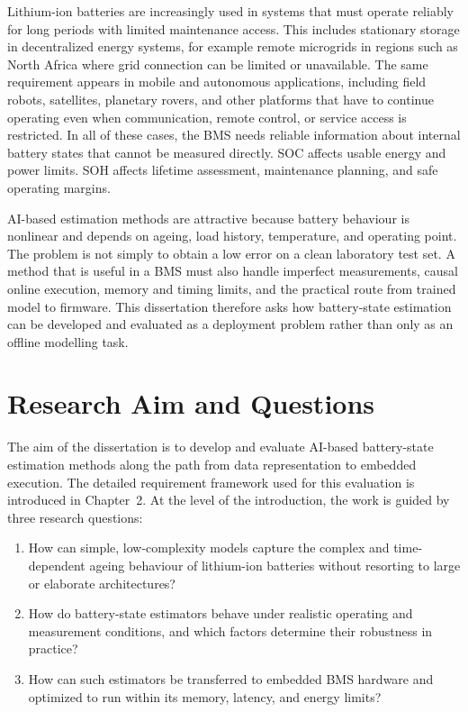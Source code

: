 \documentclass[
    a4paper,
    12pt,
    titlepage,
    bibliography=totoc,
    twoside=on,
    parskip=false,
    numbers=noenddot,
    cleardoublepage=empty,
    DIV=12,
    BCOR=12.0mm,
    headheight=36pt,
    headings=openright
]{scrreprt}
\begin{document}
Lithium-ion batteries are increasingly used in systems that must operate reliably for long periods with limited maintenance access. This includes stationary storage in decentralized energy systems, for example remote microgrids in regions such as North Africa where grid connection can be limited or unavailable. The same requirement appears in mobile and autonomous applications, including field robots, satellites, planetary rovers, and other platforms that have to continue operating even when communication, remote control, or service access is restricted. In all of these cases, the BMS needs reliable information about internal battery states that cannot be measured directly. SOC affects usable energy and power limits. SOH affects lifetime assessment, maintenance planning, and safe operating margins.

AI-based estimation methods are attractive because battery behaviour is nonlinear and depends on ageing, load history, temperature, and operating point. The problem is not simply to obtain a low error on a clean laboratory test set. A method that is useful in a BMS must also handle imperfect measurements, causal online execution, memory and timing limits, and the practical route from trained model to firmware. This dissertation therefore asks how battery-state estimation can be developed and evaluated as a deployment problem rather than only as an offline modelling task.

\section{Research Aim and Questions}
The aim of the dissertation is to develop and evaluate AI-based battery-state estimation methods along the path from data representation to embedded execution. The detailed requirement framework used for this evaluation is introduced in Chapter~2. At the level of the introduction, the work is guided by three research questions:

\begin{enumerate}[leftmargin=*]
\item How can simple, low-complexity models capture the complex and time-dependent ageing behaviour of lithium-ion batteries without resorting to large or elaborate architectures?
\item How do battery-state estimators behave under realistic operating and measurement conditions, and which factors determine their robustness in practice?
\item How can such estimators be transferred to embedded BMS hardware and optimized to run within its memory, latency, and energy limits?
\end{enumerate}
\end{document}
